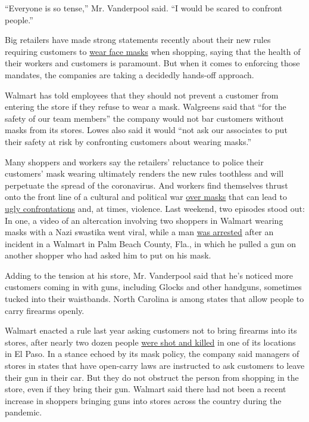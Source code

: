 ``Everyone is so tense,'' Mr. Vanderpool said. ``I would be scared to
confront people.''

Big retailers have made strong statements recently about their new rules
requiring customers to
\href{https://www.nytimes3xbfgragh.onion/article/which-stores-require-masks.html?searchResultPosition=3}{wear
face masks} when shopping, saying that the health of their workers and
customers is paramount. But when it comes to enforcing those mandates,
the companies are taking a decidedly hands-off approach.

Walmart has told employees that they should not prevent a customer from
entering the store if they refuse to wear a mask. Walgreens said that
``for the safety of our team members'' the company would not bar
customers without masks from its stores. Lowes also said it would ``not
ask our associates to put their safety at risk by confronting customers
about wearing masks.''

Many shoppers and workers say the retailers' reluctance to police their
customers' mask wearing ultimately renders the new rules toothless and
will perpetuate the spread of the coronavirus. And workers find
themselves thrust onto the front line of a cultural and political war
\href{https://www.nytimes3xbfgragh.onion/2020/05/03/us/coronavirus-masks-protests.html}{over
masks} that can lead to
\href{https://www.nytimes3xbfgragh.onion/2020/05/15/us/coronavirus-masks-violence.html?searchResultPosition=105}{ugly
confrontations} and, at times, violence. Last weekend, two episodes
stood out: In one, a video of an altercation involving two shoppers in
Walmart wearing masks with a Nazi swastika went viral, while a man
\href{https://www.facebookcorewwwi.onion/palmbeachcountysheriff/}{was
arrested} after an incident in a Walmart in Palm Beach County, Fla., in
which he pulled a gun on another shopper who had asked him to put on his
mask.

Adding to the tension at his store, Mr. Vanderpool said that he's
noticed more customers coming in with guns, including Glocks and other
handguns, sometimes tucked into their waistbands. North Carolina is
among states that allow people to carry firearms openly.

Walmart enacted a rule last year asking customers not to bring firearms
into its stores, after nearly two dozen people
\href{https://www.nytimes3xbfgragh.onion/2019/08/03/us/el-paso-shooting.html}{were
shot and killed} in one of its locations in El Paso. In a stance echoed
by its mask policy, the company said managers of stores in states that
have open-carry laws are instructed to ask customers to leave their gun
in their car. But they do not obstruct the person from shopping in the
store, even if they bring their gun. Walmart said there had not been a
recent increase in shoppers bringing guns into stores across the country
during the pandemic.


